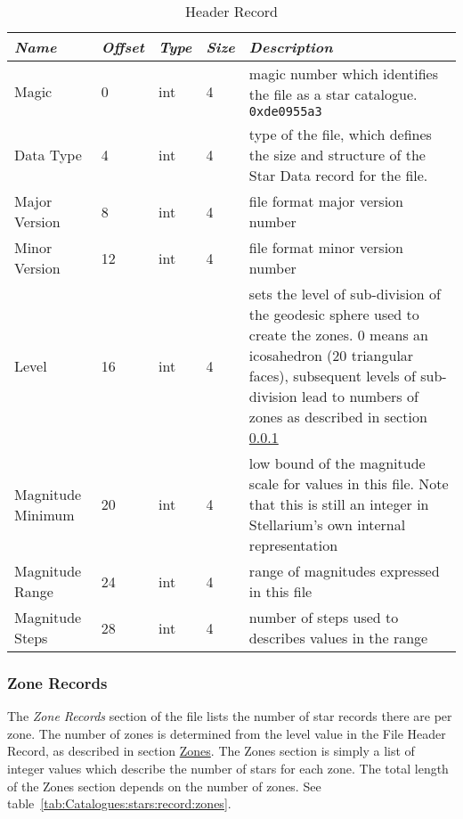\begin{table}[htbp]
\begin{tabularx}{\textwidth}{llllX}\toprule
\emph{Name} & \emph{Offset} & \emph{Type} & \emph{Size} & \emph{Description}\\\midrule
Magic             &  0 & int & 4 & magic number which identifies the file as a star catalogue. \texttt{0xde0955a3}\\%
Data Type         &  4 & int & 4 & type of the file, which defines the size and structure 
                                   of the Star Data record for the file.\\%
Major Version     &  8 & int & 4 & file format major version number\\%
Minor Version     & 12 & int & 4 & file format minor version number\\%
Level             & 16 & int & 4 & sets the level of sub-division of the geodesic sphere used to create the zones. 
                                   0 means an icosahedron (20 triangular faces), 
                                   subsequent levels of sub-division lead to numbers of zones 
                                   as described in section \ref{sec:Catalogues:stars:record:zone}\\%
Magnitude Minimum & 20 & int & 4 &  low bound of the magnitude scale for values in this file. 
                                   Note that this is still an integer in Stellarium's own internal representation\\%
Magnitude Range   & 24 & int & 4 & range of magnitudes expressed in this file\\%
Magnitude Steps   & 28 & int & 4 & number of steps used to describes values in the range\\\bottomrule
\end{tabularx}
\caption{Header Record}
\label{tab:Catalogues:stars:record:header}
\end{table}

\subsubsection{Zone Records}%
\label{sec:Catalogues:stars:record:zone}


The \emph{Zone Records} section of the file lists the number of star
records there are per zone. The number of zones is determined from the
level value in the File Header Record, as described in section
\href{Star_Catalogue\#Zones}{Zones}. The Zones section is simply a list
of integer values which describe the number of stars for each zone. The
total length of the Zones section depends on the number of zones. See
table~\ref{tab:Catalogues:stars:record:zones}. %

